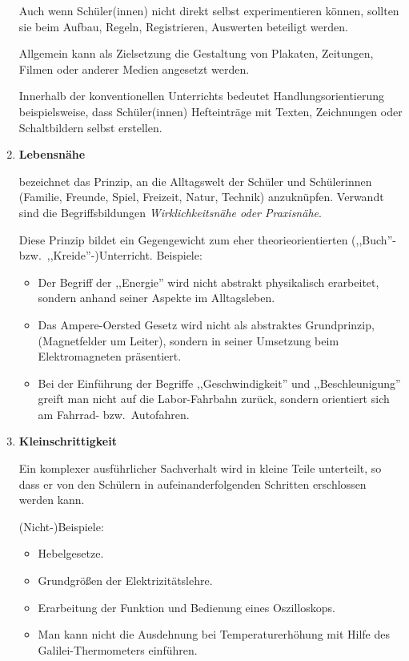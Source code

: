 \begin{enumerate}
	\mip
	Auch wenn Sch\"{u}ler(innen) nicht direkt selbst experimentieren
	k\"{o}nnen, sollten sie beim Aufbau, Regeln, Registrieren, Auswerten
	beteiligt werden.
	
	\mip
	Allgemein kann als Zielsetzung die Gestaltung von
	Plakaten, Zeitungen,
	Filmen oder anderer Medien angesetzt werden.
	
	\mip
	Innerhalb der konventionellen Unterrichts bedeutet
	Handlungsorientierung
	beispielsweise, dass Sch\"{u}ler(innen)
	Hefteintr\"{a}ge mit Texten, Zeichnungen
	oder Schaltbildern selbst erstellen.
	
	\item{\textbf{Lebensn\"{a}he}}
	
	bezeichnet das Prinzip, an die Alltagswelt der Sch\"{u}ler und
	Sch\"{u}lerinnen (Familie, Freunde, Spiel, Freizeit, Natur,
	Technik) anzukn\"{u}pfen. Verwandt sind die Begriffsbildungen
	{\it Wirklichkeitsn\"{a}he oder Praxisn\"{a}he}.
	
	Diese Prinzip bildet ein Gegengewicht zum eher theorieorientierten
	(,,Buch''- bzw.\ ,,Kreide''-)Unterricht.
	Beispiele:
	\begin{itemize}
	\item
	Der Begriff der ,,Energie'' wird nicht abstrakt physikalisch
	erarbeitet, sondern anhand seiner Aspekte im Alltagsleben.
	\item
	Das Ampere-Oersted Gesetz wird nicht als abstraktes Grundprinzip,
	(Magnetfelder um Leiter), sondern in seiner Umsetzung
	beim Elektromagneten pr\"{a}sentiert.
	\item
	Bei der Einf\"{u}hrung der Begriffe ,,Geschwindigkeit'' und
	,,Beschleunigung'' greift man nicht auf die Labor-Fahrbahn
	zur\"{u}ck, sondern orientiert sich am Fahrrad- bzw.\ Autofahren.
	\end{itemize}
	
	\item{\textbf{Kleinschrittigkeit}}
	
	Ein komplexer ausf\"{u}hrlicher Sachverhalt wird
	in kleine Teile unterteilt, so dass er von den Sch\"{u}lern
	in aufeinanderfolgenden Schritten erschlossen werden kann.
	
	(Nicht-)Beispiele:
	\begin{itemize}
		\item Hebelgesetze.
		\item Grundgr\"{o}{\ss}en der Elektrizit\"{a}tslehre.
		\item Erarbeitung der Funktion und Bedienung eines Oszilloskops.
		\item Man kann nicht die Ausdehnung bei
		Temperaturerh\"{o}hung mit Hilfe des Galilei-Thermometers einf\"{u}hren.
	\end{itemize}
	

\end{enumerate}
